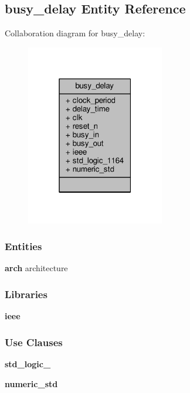 \subsection{busy\+\_\+delay Entity Reference}
\label{classbusy__delay}


Collaboration diagram for busy\+\_\+delay\+:\nopagebreak
\begin{figure}[H]
\begin{center}
\leavevmode
\includegraphics[width=171pt]{d4/d1d/classbusy__delay__coll__graph}
\end{center}
\end{figure}
\subsubsection*{Entities}
\begin{DoxyCompactItemize}
\item 
{\bf arch} architecture
\end{DoxyCompactItemize}
\subsubsection*{Libraries}
 \begin{DoxyCompactItemize}
\item 
{\bf ieee} 
\end{DoxyCompactItemize}
\subsubsection*{Use Clauses}
 \begin{DoxyCompactItemize}
\item 
{\bf std\+\_\+logic\+\_}   
\item 
{\bf numeric\+\_\+std}   
\end{DoxyCompactItemize}
